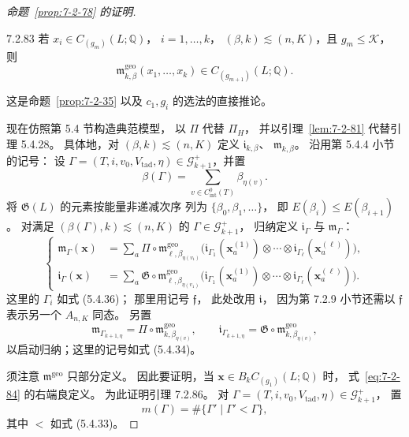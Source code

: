 \begin{proof}[命题~\ref{prop:7-2-78} 的证明]
\begin{lemma}{7.2.83}\label{lem:7-2-83}
若 $x_i\in C_{(g_m)}(L;\mathbb Q)$，
$i=1,\ldots,k$，
$(\beta,k)\lesssim(n,K)$，且 $g_m\le\mathcal K$，
则
\[
\mathfrak m^{\mathrm{geo}}_{k,\beta}
(x_1,\ldots,x_k)
\in C_{(g_{m+1})}(L;\mathbb Q).
\]
\end{lemma}
这是命题~\ref{prop:7-2-35}
以及 $c_1,g_i$ 的选法的直接推论。

现在仿照第 5.4 节构造典范模型，
以 $\Pi$ 代替 $\Pi_H$，
并以引理~\ref{lem:7-2-81}
代替引理 5.4.28。
具体地，对 $(\beta,k)\lesssim(n,K)$
定义 $\mathfrak i_{k,\beta}$、
$\mathfrak m_{k,\beta}$。
沿用第 5.4.4 小节的记号：
设
$\Gamma=(T,i,v_0,V_{\mathrm{tad}},\eta)
\in\mathcal G^+_{k+1}$，并置
\[
\beta(\Gamma)=
\sum_{v\in C^0_{\mathrm{int}}(T)}\beta_{\eta(v)}.
\]
将 $\mathfrak G(L)$ 的元素按能量非递减次序
列为 $\{\beta_0,\beta_1,\ldots\}$，
即 $E(\beta_i)\le E(\beta_{i+1})$。
对满足
$(\beta(\Gamma),k)\lesssim(n,K)$ 的
$\Gamma\in\mathcal G^+_{k+1}$，
归纳定义 $\mathfrak i_\Gamma$ 与
$\mathfrak m_\Gamma$：
\begin{equation}
\left\{\begin{aligned}
\mathfrak m_\Gamma(\mathbf x)
&=\sum_a\Pi\circ
\mathfrak m^{\mathrm{geo}}_{\ell,\beta_{\eta(v_1)}}
\bigl(\mathfrak i_{\Gamma_1}(\mathbf x_a^{(1)})
\otimes\cdots\otimes
\mathfrak i_{\Gamma_\ell}(\mathbf x_a^{(\ell)})\bigr),\\
\mathfrak i_\Gamma(\mathbf x)
&=\sum_a\mathfrak G\circ
\mathfrak m^{\mathrm{geo}}_{\ell,\beta_{\eta(v_1)}}
\bigl(\mathfrak i_{\Gamma_1}(\mathbf x_a^{(1)})
\otimes\cdots\otimes
\mathfrak i_{\Gamma_\ell}(\mathbf x_a^{(\ell)})\bigr).
\end{aligned}\right.
\tag{7.2.84}\label{eq:7-2-84}
\end{equation}
这里的 $\Gamma_i$ 如式 (5.4.36)；
那里用记号 $\mathfrak f$，
此处改用 $\mathfrak i$，
因为第 7.2.9 小节还需以 $\mathfrak f$
表示另一个 $A_{n,K}$ 同态。
另置
\begin{equation}
\mathfrak m_{\Gamma_{k+1,\eta}}
=\Pi\circ\mathfrak m^{\mathrm{geo}}_{k,\beta_{\eta(v)}},
\qquad
\mathfrak i_{\Gamma_{k+1,\eta}}
=\mathfrak G\circ
\mathfrak m^{\mathrm{geo}}_{k,\beta_{\eta(v)}},
\tag{7.2.85}\label{eq:7-2-85}
\end{equation}
以启动归纳；这里的记号如式 (5.4.34)。

须注意 $\mathfrak m^{\mathrm{geo}}$ 只部分定义。
因此要证明，当
$\mathbf x\in B_kC_{(g_1)}(L;\mathbb Q)$ 时，
式~\eqref{eq:7-2-84} 的右端良定义。
为此证明引理 7.2.86。
对
$\Gamma=(T,i,v_0,V_{\mathrm{tad}},\eta)
\in\mathcal G^+_{k+1}$，
置
\[
m(\Gamma)=\#\{\Gamma'\mid\Gamma'<\Gamma\},
\]
其中 $<$ 如式 (5.4.33)。


\end{proof}
